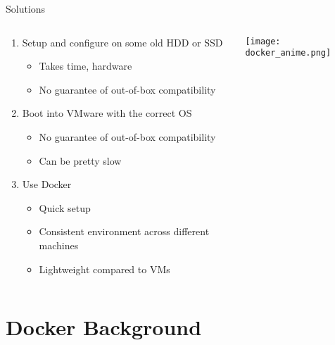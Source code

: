 \documentclass{beamer}
\begin{document}
\begin{frame}{Solutions}

    \vspace{-20pt}
    \begin{columns}[T]
        \begin{column}{0.6\textwidth}
            \begin{enumerate}
                \item Setup and configure on some old HDD or SSD
                \begin{itemize}
                    \item Takes time, hardware
                    \item No guarantee of out-of-box compatibility
                \end{itemize}
                \item Boot into VMware with the correct OS
                \begin{itemize}
                    \item No guarantee of out-of-box compatibility
                    \item Can be pretty slow
                \end{itemize}
                \item Use Docker
                \begin{itemize}
                    \item Quick setup
                    \item Consistent environment across different machines
                    \item Lightweight compared to VMs
                \end{itemize}
            \end{enumerate}
        \end{column}
        \begin{column}{0.4\textwidth}
            \texttt{[image: docker\_anime.png]}
        \end{column}
    \end{columns}
\end{frame}

\section{Docker Background}
\end{document}
